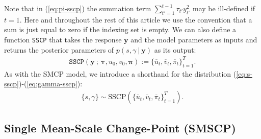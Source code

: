 Note that in (\ref{eq:pi-sscp}) the summation term $\sum_{t'=1}^{t-1} \tau_{t'}y_{t'}^2$ may be ill-defined if $t = 1$. Here and throughout the rest of this article we use the convention that a sum is just equal to zero if the indexing set is empty. We can also define a function \texttt{SSCP} that takes the response $\mathbf{y}$ and the model parameters as inputs and returns the posterior parameters of $p(s, \gamma\:|\:\mathbf{y})$ as its output: 
\begin{align}
    \texttt{SSCP}\left(\mathbf{y} \:;\: \pmb{\tau}, u_0, v_0, \pmb{\pi}\right) := \{\overline{u}_t, \overline{v}_t, \overline{\pi}_t\}_{t=1}^T.
\end{align}
As with the SMCP model, we introduce a shorthand for the distribution (\ref{eq:s-sscp})-(\ref{eq:gamma-sscp}): 
\begin{align}
    \{s,\gamma\} \sim \text{SSCP}(\{\overline{u}_t, \overline{v}_t, \overline{\pi}_t\}_{t=1}^T).
\end{align}

\subsection{Single Mean-Scale Change-Point (SMSCP)}
\label{sec:smscp}


